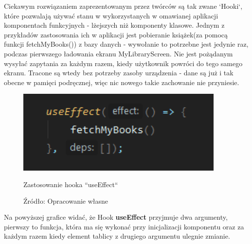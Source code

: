 \newpage
Ciekawym rozwiązaniem zaprezentowanym przez twórców są tak zwane `Hooki`, które pozwalają używać stanu w wykorzystanych w omawianej aplikacji komponentach funkcyjnych - lżejszych niż komponenty klasowe.\newline
Jednym z przykładów zastosowania ich w aplikacji jest pobieranie książek(za pomocą funkcji fetchMyBooks()) z bazy danych - wywołanie to potrzebne jest jedynie raz, podczas pierwszego ładowania ekranu MyLibraryScreen. Nie jest pożądanym wysyłać zapytania za każdym razem, kiedy użytkownik powróci do tego samego ekranu. Tracone są wtedy bez potrzeby zasoby urządzenia - dane są już i tak obecne w pamięci podręcznej, więc nic nowego takie zachowanie nie przyniesie.
\begin{figure}[H]
	\centering
	\includegraphics{hook.pdf}
	\caption{\centering Zastosowanie hooka ``useEffect``}
	\caption*{\centering Źródło: {Opracowanie własne}}
\end{figure}
Na powyższej grafice widać, że Hook \textbf{useEffect} przyjmuje dwa argumenty, pierwszy to funkcja, która ma się wykonać przy inicjalizacji komponentu oraz za każdym razem kiedy element tablicy z drugiego argumentu ulegnie zmianie.


